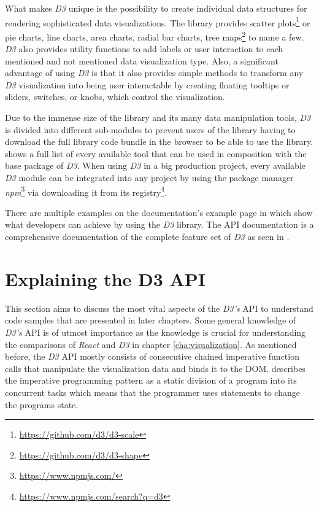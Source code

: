 What makes \emph{D3} unique is the possibility to create individual data structures for rendering sophisticated data visualizations. The library provides scatter plots\footnote{\url{https://github.com/d3/d3-scale}} or pie charts, line charts, area charts, radial bar charts, tree maps\footnote{\url{https://github.com/d3/d3-shape}} to name a few. \emph{D3} also provides utility functions to add labels or user interaction to each mentioned and not mentioned data visualization type. Also, a significant advantage of using \emph{D3} is that it also provides simple methods to transform any \emph{D3} visualization into being user interactable by creating floating tooltips or sliders, switches, or knobs, which control the visualization.

Due to the immense size of the library and its many data manipulation tools, \emph{D3} is divided into different sub-modules to prevent users of the library having to download the full library code bundle in the browser to be able to use the library. \cite{D3Github} shows a full list of every available tool that can be used in composition with the base package of \emph{D3}. When using \emph{D3} in a big production project, every available \emph{D3} module can be integrated into any project by using the package manager \emph{npm}\footnote{\url{https://www.npmjs.com/}} via downloading it from its registry\footnote{\url{https://www.npmjs.com/search?q=d3}}.

\begin{emergency}{1em}
There are multiple examples on the documentation's example page in \cite{D3Examples} which show what developers can achieve by using the \emph{D3} library. The API documentation is a comprehensive documentation of the complete feature set of \emph{D3} as seen in \cite{D3Github}. %
\end{emergency}


\section{Explaining the D3 API} 

This section aims to discuss the most vital aspects of the \emph{D3's} API to understand code samples that are presented in later chapters. Some general knowledge of \emph{D3's} API is of utmost importance as the knowledge is crucial for understanding the comparisons of \emph{React} and \emph{D3} in chapter \ref{cha:visualization}. As mentioned before, the \emph{D3} API mostly consists of consecutive chained imperative function calls that manipulate the visualization data and binds it to the DOM. \cite[p.\ 625]{prgLngDesignImpl} describes the imperative programming pattern as a static division of a program into its concurrent tasks which means that the programmer uses statements to change the programs state. 

